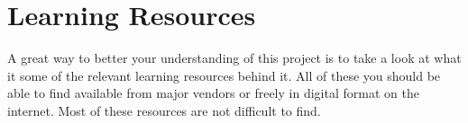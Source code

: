\chapter{Learning Resources}

A great way to better your understanding of this project is to take a look at what it some of the relevant learning resources behind it. All of these you should be able to find available from major vendors or freely in digital format on the internet. Most of these resources are not difficult to find.






